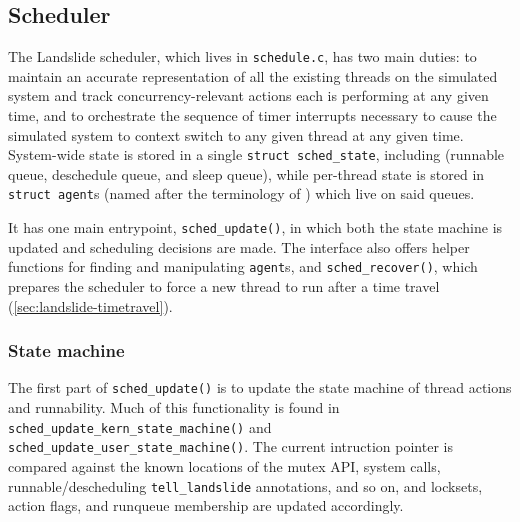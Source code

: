
\subsection{Scheduler}
\label{sec:landslide-scheduler}

The Landslide scheduler, which lives in {\tt schedule.c}, has two main duties:
to maintain an accurate representation of all the existing threads on the simulated system
and track  concurrency-relevant actions each is performing at any given time,
and to orchestrate the sequence of timer interrupts necessary
to cause the simulated system to context switch to any given thread at any given time.
System-wide state is stored in a single {\tt struct sched\_state},
including 
(runnable queue, deschedule queue, and sleep queue),
while per-thread state is stored in {\tt struct agent}s (named after the terminology of \cite{dbug-ssv}) which live on said queues.

It has one main entrypoint, {\tt sched\_update()}, in which both the state machine is updated and scheduling decisions are made.
The interface also offers helper functions for finding and manipulating {\tt agent}s,
and {\tt sched\_recover()}, which prepares the scheduler to force a new thread to run
after a time travel (\cref{sec:landslide-timetravel}).

\subsubsection{State machine}
\label{sec:landslide-scheduler-statemachine}

The first part of {\tt sched\_update()} is to update the state machine of thread actions and runnability.
Much of this functionality is found in
{\tt sched\_update\_kern\_state\_machine()}
and
{\tt sched\_update\_user\_state\_machine()}.
The current intruction pointer is compared against the known locations of
the mutex API, system calls, runnable/descheduling {\tt tell\_\allowbreak{}landslide} annotations, and so on,
and locksets, action flags, and runqueue membership are updated accordingly.

